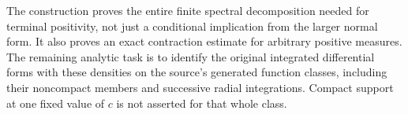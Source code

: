 The construction proves the entire finite
spectral decomposition needed for terminal
positivity, not just a conditional implication
from the larger normal form.  It also proves
an exact contraction estimate for arbitrary
positive measures.  The remaining analytic
task is to identify the original integrated
differential forms with these densities on
the source's generated function classes,
including their noncompact members and
successive radial integrations.  Compact
support at one fixed value of $c$ is not
asserted for that whole class.


